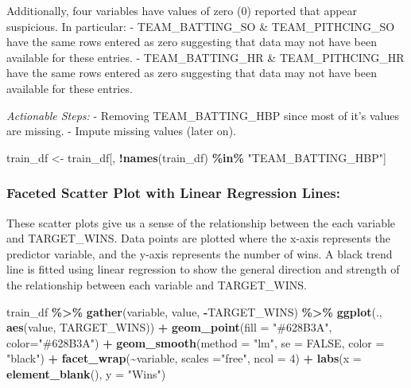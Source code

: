 \documentclass[
]{article}
\newenvironment{Shaded}{\begin{snugshade}}{\end{snugshade}}
\newcommand{\AttributeTok}[1]{\textcolor[rgb]{0.13,0.29,0.53}{#1}}
\newcommand{\ConstantTok}[1]{\textcolor[rgb]{0.56,0.35,0.01}{#1}}
\newcommand{\DecValTok}[1]{\textcolor[rgb]{0.00,0.00,0.81}{#1}}
\newcommand{\FunctionTok}[1]{\textcolor[rgb]{0.13,0.29,0.53}{\textbf{#1}}}
\newcommand{\NormalTok}[1]{#1}
\newcommand{\OtherTok}[1]{\textcolor[rgb]{0.56,0.35,0.01}{#1}}
\newcommand{\SpecialCharTok}[1]{\textcolor[rgb]{0.81,0.36,0.00}{\textbf{#1}}}
\newcommand{\StringTok}[1]{\textcolor[rgb]{0.31,0.60,0.02}{#1}}
\begin{document}
Additionally, four variables have values of zero (0) reported that
appear suspicious. In particular: - TEAM\_BATTING\_SO \&
TEAM\_PITHCING\_SO have the same rows entered as zero suggesting that
data may not have been available for these entries. - TEAM\_BATTING\_HR
\& TEAM\_PITHCING\_HR have the same rows entered as zero suggesting that
data may not have been available for these entries.

\emph{Actionable Steps:} - Removing TEAM\_BATTING\_HBP since most of
it's values are missing. - Impute missing values (later on).

\begin{Shaded}
\begin{Highlighting}[]
\NormalTok{train\_df }\OtherTok{\textless{}{-}}\NormalTok{ train\_df[, }\SpecialCharTok{!}\FunctionTok{names}\NormalTok{(train\_df) }\SpecialCharTok{\%in\%} \StringTok{"TEAM\_BATTING\_HBP"}\NormalTok{]}
\end{Highlighting}
\end{Shaded}

\subsubsection{Faceted Scatter Plot with Linear Regression
Lines:}\label{faceted-scatter-plot-with-linear-regression-lines}

These scatter plots give us a sense of the relationship between the each
variable and TARGET\_WINS. Data points are plotted where the x-axis
represents the predictor variable, and the y-axis represents the number
of wins. A black trend line is fitted using linear regression to show
the general direction and strength of the relationship between each
variable and TARGET\_WINS.

\begin{Shaded}
\begin{Highlighting}[]
\NormalTok{train\_df }\SpecialCharTok{\%\textgreater{}\%}
  \FunctionTok{gather}\NormalTok{(variable, value, }\SpecialCharTok{{-}}\NormalTok{TARGET\_WINS) }\SpecialCharTok{\%\textgreater{}\%}
  \FunctionTok{ggplot}\NormalTok{(., }\FunctionTok{aes}\NormalTok{(value, TARGET\_WINS)) }\SpecialCharTok{+} 
  \FunctionTok{geom\_point}\NormalTok{(}\AttributeTok{fill =} \StringTok{"\#628B3A"}\NormalTok{, }\AttributeTok{color=}\StringTok{"\#628B3A"}\NormalTok{)  }\SpecialCharTok{+} 
  \FunctionTok{geom\_smooth}\NormalTok{(}\AttributeTok{method =} \StringTok{"lm"}\NormalTok{, }\AttributeTok{se =} \ConstantTok{FALSE}\NormalTok{, }\AttributeTok{color =} \StringTok{"black"}\NormalTok{) }\SpecialCharTok{+} 
  \FunctionTok{facet\_wrap}\NormalTok{(}\SpecialCharTok{\textasciitilde{}}\NormalTok{variable, }\AttributeTok{scales =}\StringTok{"free"}\NormalTok{, }\AttributeTok{ncol =} \DecValTok{4}\NormalTok{) }\SpecialCharTok{+}
  \FunctionTok{labs}\NormalTok{(}\AttributeTok{x =} \FunctionTok{element\_blank}\NormalTok{(), }\AttributeTok{y =} \StringTok{"Wins"}\NormalTok{)}
\end{Highlighting}
\end{Shaded}
\end{document}
